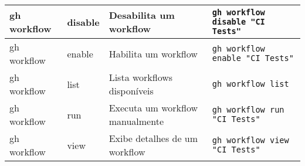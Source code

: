 \begin{longtable}{|p{2cm}|p{2.3cm}|p{4cm}|p{6cm}|}
    \hline
    gh workflow & disable & Desabilita um workflow & \texttt{gh workflow disable "CI Tests"} \\
    \hline
    gh workflow & enable & Habilita um workflow & \texttt{gh workflow enable "CI Tests"} \\
    \hline
    gh workflow & list & Lista workflows disponíveis & \texttt{gh workflow list} \\
    \hline
    gh workflow & run & Executa um workflow manualmente & \texttt{gh workflow run "CI Tests"} \\
    \hline
    gh workflow & view & Exibe detalhes de um workflow & \texttt{gh workflow view "CI Tests"} \\
    \hline
\end{longtable}